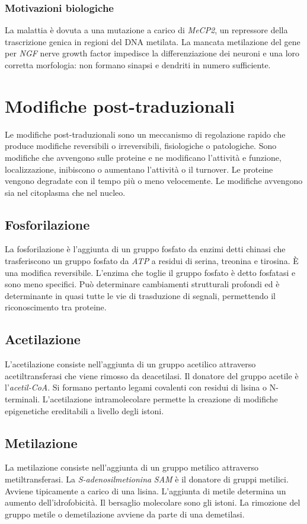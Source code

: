 		\subsubsection{Motivazioni biologiche}
		La malattia \`e dovuta a una mutazione a carico di \emph{MeCP2}, un repressore della trascrizione genica in regioni del DNA metilata.
		La mancata metilazione del gene per \emph{NGF} nerve growth factor impedisce la differenziazione dei neuroni e una loro corretta morfologia: non formano sinapsi e dendriti in numero sufficiente.

\section{Modifiche post-traduzionali}
Le modifiche post-traduzionali sono un meccanismo di regolazione rapido che produce modifiche reversibili o irreversibili, fisiologiche o patologiche.
Sono modifiche che avvengono sulle proteine e ne modificano l'attivit\`a e funzione, localizzazione, inibiscono o aumentano l'attivit\`a o il turnover. 
Le proteine vengono degradate con il tempo pi\`u o meno velocemente.
Le modifiche avvengono sia nel citoplasma che nel nucleo.

	\subsection{Fosforilazione}
	La fosforilazione \`e l'aggiunta di un gruppo fosfato da enzimi detti chinasi che trasferiscono un gruppo fosfato da \emph{ATP} a residui di serina, treonina e tirosina.
	\`E una modifica reversibile. 
	L'enzima che toglie il gruppo fosfato \`e detto fosfatasi e sono meno specifici.
	Pu\`o determinare cambiamenti strutturali profondi ed \`e determinante in quasi tutte le vie di trasduzione di segnali, permettendo il riconoscimento tra proteine.

	\subsection{Acetilazione}
	L'acetilazione consiste nell'aggiunta di un gruppo acetilico attraverso acetiltransferasi che viene rimosso da deacetilasi. 
	Il donatore del gruppo acetile \`e l'\emph{acetil-CoA}.
	Si formano pertanto legami covalenti con residui di lisina o N-terminali.
	L'acetilazione intramolecolare permette la creazione di modifiche epigenetiche ereditabili a livello degli istoni.


	\subsection{Metilazione}
	La metilazione consiste nell'aggiunta di un gruppo metilico attraverso metiltransferasi.
	La \emph{S-adenosilmetionina} \emph{SAM} \`e il donatore di gruppi metilici.
	Avviene tipicamente a carico di una lisina.
	L'aggiunta di metile determina un aumento dell'idrofobicit\`a.
	Il bersaglio molecolare sono gli istoni.
	La rimozione del gruppo metile o demetilazione avviene da parte di una demetilasi.

